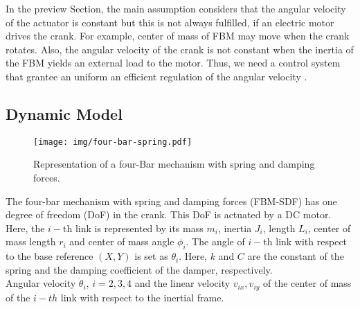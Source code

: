 \documentclass[12pt,letterpape]{article}
\begin{document}
In the preview Section, the main assumption considers that the angular velocity
of the actuator is constant but this is not always fulfilled, if an electric motor
drives the crank. For example, center of mass of FBM may move when the crank rotates.
Also, the angular velocity of the crank is not constant when the inertia of the 
FBM yields an external load to the motor. Thus, we need a control system that grantee 
an uniform an efficient regulation of the angular velocity \cite{calva13}.

\subsection{Dynamic Model} %
\label{sub:dynamic_model}

\begin{figure}[!ht]
	\centering
	\texttt{[image: img/four-bar-spring.pdf]}
	\caption{Representation of a four-Bar mechanism with spring and damping forces.}
\end{figure}

The four-bar mechanism with spring and damping forces (FBM-SDF) has one degree of
freedom (DoF) in the crank. This DoF is actuated by a DC motor. Here, the $i-$th
link is represented by its mass $m_i$, inertia $J_i$, length $L_i$, center of mass
length $r_i$ and center of mass angle $\phi_i$. The angle of $i-$th link with
respect to the base reference $(X, Y)$ is set as $\theta_i$. Here, $k$ and $C$
are the constant of the spring and the damping coefficient of the damper, respectively.\\

Angular velocity $\dot{\theta}_i$, $ i = 2,3,4$ and the linear velocity $v_{ix},v_{iy}$
of the center of mass of the $i-th$ link with respect to the inertial frame.
\end{document}

